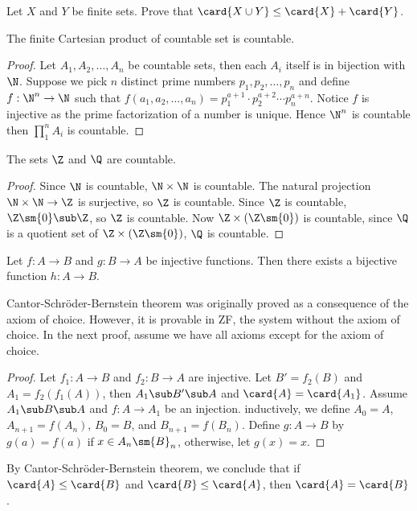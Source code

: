 \documentclass[10pt]{article}
\begin{document}
\begin{problem}
    Let $X$ and $Y$ be finite sets. Prove that $\card{X\cup Y}\le\card{X}+\card{Y}$.
\end{problem}
\begin{proposition}
    The finite Cartesian product of countable set is countable.
\end{proposition}
\begin{proof}
    Let ${A}_{1},{A}_{2},\dots,{A}_{n}$ be countable sets, then each ${A}_{i}$ itself is in bijection with $\N$. Suppose we pick $n$ distinct prime numbers ${p}_{1},{p}_{2},\dots,{p}_{n}$ and define $f:{\N}^{n}\to\N$ such that $f({a}_{1},{a}_{2},\dots,{a}_{n})={p}_{1}^{a+1}\cdot{p}_{2}^{a+2}\cdots{p}_{n}^{a+n}$. Notice $f$ is injective as the prime factorization of a number is unique. Hence ${\N}^{n}$ is countable then ${\prod}_{1}^{n}{A}_{i}$ is countable.
\end{proof}
\begin{proposition} 
    The sets $\Z$ and $\Q$ are countable.
\end{proposition}
\begin{proof}
    Since $\N$ is countable, $\N\times\N$ is countable. The natural projection $\N\times\N\to\Z$ is surjective, so $\Z$ is countable. Since $\Z$ is countable, $\Z\sm\{0\}\sub\Z$, so $\Z$ is countable. Now $\Z\times(\Z\sm\{0\})$ is countable, since $\Q$ is a quotient set of $\Z\times(\Z\sm\{0\})$, $\Q$ is countable.
\end{proof}
\begin{theorem}
    Let $f:A\to B$ and $g:B\to A$ be injective functions. Then there exists a bijective function $h:A\to B$.
\end{theorem}
\begin{remark}
    Cantor-Schröder-Bernstein theorem was originally proved as a consequence of the axiom of choice. However, it is provable in ZF, the system without the axiom of choice. In the next proof, assume we have all axioms except for the axiom of choice.
\end{remark}
\begin{proof}
    Let ${f}_{1}:A\to B$ and ${f}_{2}:B\to A$ are injective. Let $B'={f}_{2}(B)$ and ${A}_{1}={f}_{2}({f}_{1}(A))$, then ${A}_{1}\sub B'\sub A$ and $\card{A}=\card{{A}_{1}}$. Assume ${A}_{1}\sub B\sub A$ and $f:A\to{A}_{1}$ be an injection. inductively, we define ${A}_{0}=A$, ${A}_{n+1}=f({A}_{n})$, ${B}_{0}=B$, and ${B}_{n+1}=f({B}_{n})$. Define $g:A\to B$ by $g(a)=f(a)$ if $x\in{A}_{n}\sm{B}_{n}$, otherwise, let $g(x)=x$. 
\end{proof}
\par
By Cantor-Schröder-Bernstein theorem, we conclude that if $\card{A}\le\card{B}$ and $\card{B}\le\card{A}$, then $\card{A}=\card{B}$.
\newpage
\end{document}
